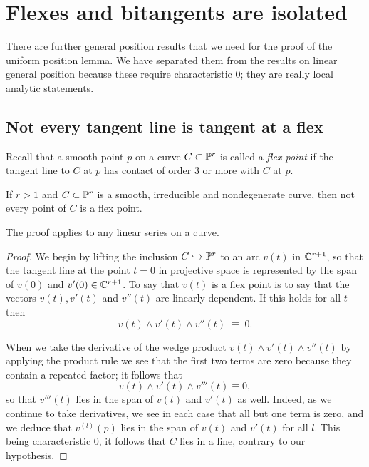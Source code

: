 \section{Flexes and bitangents are isolated}\label{isolated flexes
and bitangents}

There are  further general position results that we need for the proof
of the uniform position lemma.  We have separated
them from the results on linear general position because these require
characteristic 0; they are really local analytic
statements.

\subsection*{Not every tangent line is tangent at a flex}


Recall that a smooth point $p$ on a curve $C \subset \PP^r$ is called
a \emph{flex point} if the tangent line to $C$ at  $p$ has contact of
%
order 3 or more with $C$ at $p$.

\begin{lemma}\label{finite inflections}
If $r>1$ and $C \subset \PP^r$ is a smooth, irreducible and nondegenerate
curve, then not every point of $C$ is a flex point.
\unif
\end{lemma}

The proof applies to any linear series on a curve.
\unif

\begin{proof}
We begin by lifting the inclusion $C \hookrightarrow \PP^r$ to an arc
$v (t)$ in $\CC^{r+1}$, so that the tangent line at the point $t=0$
in projective space
is represented by the span of $v(0)$ and $v'(0) \in \CC^{r+1}$. To say
that $v(t)$ is a flex point is to say that the  vectors $v(t), v'(t)$
and $v''(t)$ are linearly dependent. If this holds for all $t$ then
$$
v(t) \wedge  v'(t) \wedge v''(t) \; \equiv \; 0.
$$

When we take the derivative of the wedge product $v(t) \wedge v'(t)
\wedge v''(t)$ by applying the product rule we see that the first two
terms are zero because they contain a repeated factor; it follows that
$$
v(t) \wedge  v'(t) \wedge v'''(t) \equiv 0,
$$
so that $v'''(t)$ lies in the span of $v(t)$ and $v'(t)$ as well. Indeed,
as we continue to take derivatives, we see in each case that all but one
term is zero, and we deduce that $v^{(l)}(p)$ lies in the span of $v(t)$
and $v'(t)$ for all $l$. This being characteristic 0, it follows that $C$
lies in a line, contrary to our hypothesis.
\end{proof}


